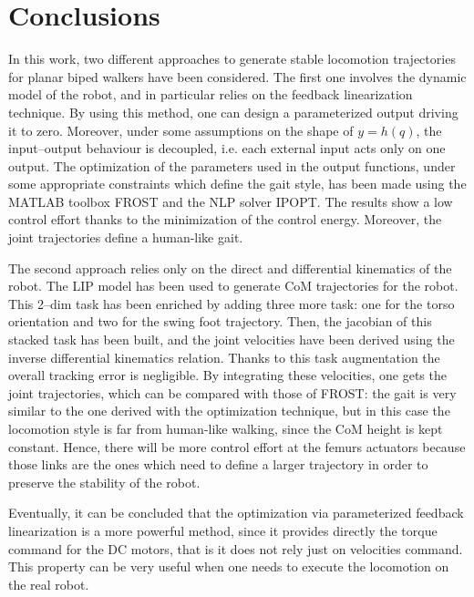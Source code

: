\documentclass[11pt]{article}
\begin{document}
\section*{Conclusions}

In this work, two different approaches to generate stable locomotion trajectories for planar biped walkers have been considered. The first one involves the dynamic model of the robot, and in particular relies on the feedback linearization technique. By using this method, one can design a parameterized output driving it to zero. Moreover, under some assumptions on the shape of $y=h(q)$, the input--output behaviour is decoupled, i.e. each external input acts only on one output. The optimization of the parameters used in the output functions, under some appropriate constraints which define the gait style, has been made using the MATLAB toolbox FROST and the NLP solver IPOPT. The results show a low control effort thanks to the minimization of the control energy. Moreover, the joint trajectories define a human-like gait.

The second approach relies only on the direct and differential kinematics of the robot. The LIP model has been used to generate CoM trajectories for the robot. This 2--dim task has been enriched by adding three more task: one for the torso orientation and two for the swing foot trajectory. Then, the jacobian of this stacked task has been built, and the joint velocities have been derived using the inverse differential kinematics relation. Thanks to this task augmentation the overall tracking error is negligible. By integrating these velocities, one gets the joint trajectories, which can be compared with those of FROST: the gait is very similar to the one derived with the optimization technique, but in this case the locomotion style is far from human-like walking, since the CoM height is kept constant. Hence, there will be more control effort at the femurs actuators because those links are the ones which need to define a larger trajectory in order to preserve the stability of the robot.

Eventually, it can be concluded that the optimization via parameterized feedback linearization is a more powerful method, since it provides directly the torque command for the DC motors, that is it does not rely just on velocities command. This property can be very useful when one needs to execute the locomotion on the real robot.

\newpage
\end{document}
